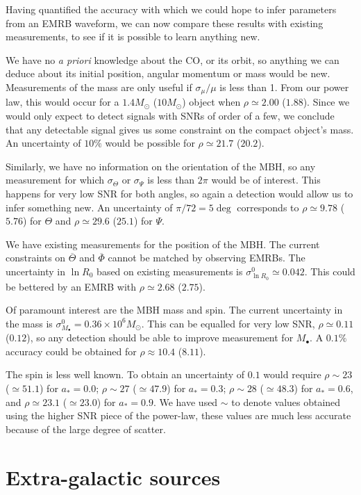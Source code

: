 \documentclass[useAMS,usedcolumn,usegraphicx,usenatbib]{mn2e}
\begin{document}
Having quantified the accuracy with which we could hope to infer parameters from an EMRB waveform, we can now compare these results with existing measurements, to see if it is possible to learn anything new.

We have no {\it a priori} knowledge about the CO, or its orbit, so anything we can deduce about its initial position, angular momentum or mass would be new. Measurements of the mass are only useful if $\sigma_\mu/\mu$ is less than 1. From our power law, this would occur for a $1.4 M_\odot$ ($10 M_\odot$) object when $\rho \simeq 2.00$ ($1.88$). Since we would only expect to detect signals with SNRs of order of a few, we conclude that any detectable signal gives us some constraint on the compact object's mass. An uncertainty of $10\%$ would be possible for $\rho \simeq 21.7$ ($20.2$).

Similarly, we have no information on the orientation of the MBH, so any measurement for which $\sigma_\Theta$ or $\sigma_\Psi$ is less than $2\pi$ would be of interest. This happens for very low SNR for both angles, so again a detection would allow us to infer something new. An uncertainty of $\pi/72 = 5\deg$ corresponds to $\rho \simeq 9.78$ ($5.76$) for $\Theta$ and $\rho \simeq 29.6$ ($25.1$) for $\Psi$.

We have existing measurements for the position of the MBH. The current constraints on $\overline{\Theta}$ and $\overline{\Phi}$ cannot be matched by observing EMRBs. The uncertainty in $\ln R_0$ based on existing measurements is $\sigma_{\ln R_0}^0\simeq 0.042$. This could be bettered by an EMRB with $\rho \simeq 2.68$ ($2.75$).

Of paramount interest are the MBH mass and spin. The current uncertainty in the mass is $\sigma_{M_\bullet}^0 = 0.36 \times 10^6 M_\odot$. This can be equalled for very low SNR, $\rho \simeq 0.11$ ($0.12$), so any detection should be able to improve measurement for $M_\bullet$. A $0.1\%$ accuracy could be obtained for $\rho \approx 10.4$ ($8.11$).

The spin is less well known. To obtain an uncertainty of $0.1$ would require $\rho \sim 23$ ($\simeq 51.1$) for $a_\ast = 0.0$; $\rho \sim 27$ ($\simeq 47.9$) for $a_\ast = 0.3$; $\rho \sim 28$ ($\simeq 48.3$) for $a_\ast = 0.6$, and $\rho \simeq 23.1$ ($\simeq 23.0$) for $a_\ast = 0.9$. We have used $\sim$ to denote values obtained using the higher SNR piece of the power-law, these values are much less accurate because of the large degree of scatter.

\section{Extra-galactic sources}
\end{document}
